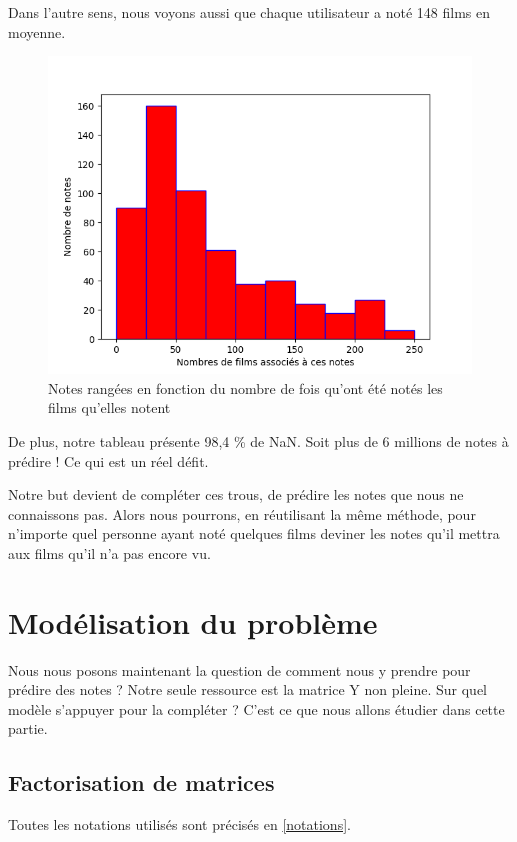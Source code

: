 \documentclass[a4paper,10pt]{article}
\begin{document}
Dans l’autre sens, nous voyons aussi que chaque utilisateur a noté 148 films en moyenne.

\begin{figure}[H]
  \centering
\includegraphics[scale=0.5]{hist1.png}
\caption{Notes rangées en fonction du nombre de fois qu'ont été notés les films qu'elles notent}
\end{figure}

De plus, notre tableau présente 98,4 \% de NaN. Soit plus de 6 millions de notes à prédire ! Ce qui est un réel défit.

Notre but devient de compléter ces trous, de prédire les notes que nous ne connaissons pas. Alors nous pourrons, en réutilisant la même méthode, pour n'importe quel personne ayant noté quelques films deviner les notes qu'il mettra aux films qu'il n'a pas encore vu.

\section{Modélisation du problème}

Nous nous posons maintenant la question de comment nous y prendre pour prédire des notes ?
Notre seule ressource est la matrice Y non pleine. Sur quel modèle s'appuyer pour la compléter ?
C'est ce que nous allons étudier dans cette partie.

\subsection{Factorisation de matrices}

Toutes les notations utilisés sont précisés en \ref{notations}.\\
\end{document}
